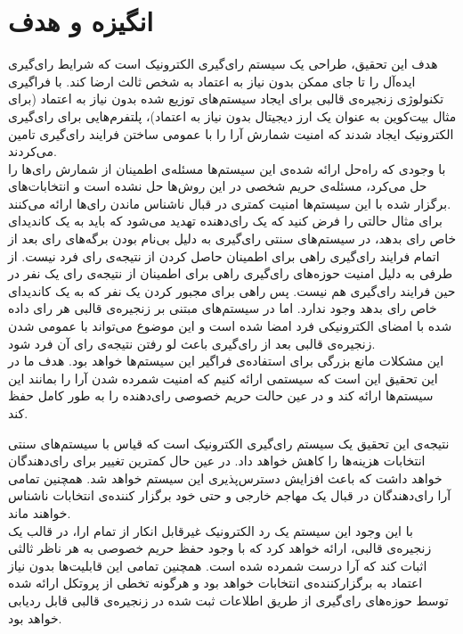 \section{انگیزه و هدف}
هدف این تحقیق، طراحی یک سیستم رای‌گیری الکترونیک است که شرایط رای‌گیری ایده‌آل را تا جای ممکن بدون نیاز به اعتماد به شخص ثالث ارضا کند. با فراگیری تکنولوژی زنجیره‌ی قالبی برای ایجاد سیستم‌های توزیع شده بدون نیاز به اعتماد (برای مثال بیت‌کوین به عنوان یک‌ ارز دیجیتال بدون نیاز به اعتماد)، پلتفرم‌هایی برای رای‌گیری الکترونیک ایجاد شدند که امنیت شمارش آرا را با عمومی ساختن فرایند رای‌گیری تامین می‌کردند. 
\\
با وجودی که راه‌حل ارائه شده‌ی این سیستم‌ها مسئله‌ی اطمینان از شمارش رای‌ها را حل می‌کرد، مسئله‌ی حریم شخصی در این روش‌ها حل نشده است و انتخابات‌های برگزار شده با این سیستم‌ها امنیت کمتری در قبال ناشناس ماندن رای‌ها ارائه می‌کنند. 
\\
برای مثال حالتی را فرض کنید که یک رای‌دهنده تهدید می‌شود که باید به یک کاندیدای خاص رای بدهد، در سیستم‌های سنتی رای‌گیری به دلیل بی‌نام بودن برگه‌های رای بعد از اتمام فرایند رای‌گیری راهی برای اطمینان حاصل کردن از نتیجه‌ی رای فرد نیست. از طرفی به دلیل امنیت حوزه‌های رای‌گیری راهی برای اطمینان از نتیجه‌ی رای یک نفر در حین فرایند رای‌گیری هم نیست. پس راهی برای مجبور کردن یک نفر که به یک کاندیدای خاص رای بدهد وجود ندارد. اما در سیستم‌های مبتنی بر زنجیره‌ی قالبی هر رای داده شده با امضای الکترونیکی فرد امضا شده است و این موضوع می‌تواند با عمومی شدن زنجیره‌ی قالبی بعد از رای‌گیری باعث لو رفتن نتیجه‌ی رای آن فرد شود.
\\
این مشکلات مانع بزرگی برای استفاده‌ی فراگیر این سیستم‌ها خواهد بود. هدف ما در این تحقیق این است که سیستمی ارائه کنیم که امنیت شمرده شدن آرا را بمانند این سیستم‌ها ارائه کند و در عین حالت حریم خصوصی رای‌دهنده را به طور کامل حفظ کند. 
\par
نتیجه‌ی این تحقیق یک سیستم‌ رای‌گیری الکترونیک است که قیاس با سیستم‌های سنتی انتخابات هزینه‌ها را کاهش خواهد داد. در عین حال کمترین تغییر برای رای‌دهندگان خواهد داشت که باعث افزایش دسترس‌پذیری این سیستم خواهد شد. همچنین تمامی آرا رای‌دهندگان در قبال یک مهاجم خارجی و حتی خود برگزار کننده‌ی انتخابات ناشناس خواهند ماند. 
\\
با این وجود این سیستم یک رد الکترونیک غیرقابل انکار از تمام ارا، در قالب یک زنجیره‌ی قالبی، ارائه ‌خواهد کرد که با وجود حفظ حریم خصوصی به هر ناظر ثالثی اثبات کند که آرا درست شمرده شده است. همچنین تمامی این قابلیت‌ها بدون نیاز اعتماد به برگزارکننده‌ی انتخابات خواهد بود و هرگونه تخطی از پروتکل ارائه شده توسط حوزه‌های رای‌گیری از طریق اطلاعات ثبت شده در زنجیره‌ی قالبی قابل ردیابی خواهد بود.








